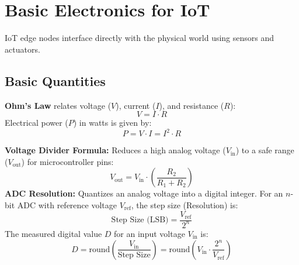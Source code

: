 \documentclass[12pt,a4paper]{article}
\begin{document}
\section{Basic Electronics for IoT}

IoT edge nodes interface directly with the physical world using sensors and actuators.

\subsection{Basic Quantities}
\begin{tcolorbox}[formulabox, title={Ohm's Law and Electrical Power}]
  \textbf{Ohm's Law} relates voltage ($V$), current ($I$), and resistance ($R$):
  \begin{equation}
    V = I \cdot R
  \end{equation}
  Electrical power ($P$) in watts is given by:
  \begin{equation}
    P = V \cdot I = I^2 \cdot R
  \end{equation}
\end{tcolorbox}

\begin{tcolorbox}[formulabox, title={Voltage Dividers and Analog-to-Digital Conversion (ADC)}]
  \textbf{Voltage Divider Formula:} Reduces a high analog voltage ($V_{\text{in}}$) to a safe range ($V_{\text{out}}$) for microcontroller pins:
  \begin{equation}
    V_{\text{out}} = V_{\text{in}} \cdot \left( \frac{R_2}{R_1 + R_2} \right)
  \end{equation}
  \textbf{ADC Resolution:} Quantizes an analog voltage into a digital integer. For an $n$-bit ADC with reference voltage $V_{\text{ref}}$, the step size (Resolution) is:
  \begin{equation}
    \text{Step Size (LSB)} = \frac{V_{\text{ref}}}{2^n}
  \end{equation}
  The measured digital value $D$ for an input voltage $V_{\text{in}}$ is:
  \begin{equation}
    D = \text{round}\left( \frac{V_{\text{in}}}{\text{Step Size}} \right) = \text{round}\left( V_{\text{in}} \cdot \frac{2^n}{V_{\text{ref}}} \right)
  \end{equation}
\end{tcolorbox}
\end{document}
